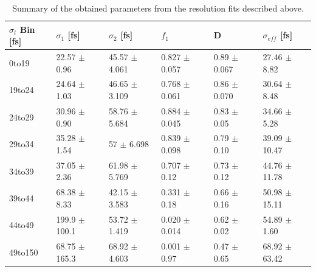 \begin{table}[h]
\centering
 \begin{tabular}{l || l l l | l l}
$\sigma_{t}$ Bin [fs] & $\sigma_{1}$ [fs] & $\sigma_{2}$ [fs] & $f_{1}$ & D & $\sigma_{eff}$ [fs] \\
\hline
0to19 & 22.57 $\pm$ 0.96 & 45.57 $\pm$ 4.061 & 0.827 $\pm$ 0.057 & 0.89 $\pm$ 0.067 & 27.46 $\pm$ 8.82 \\
19to24 & 24.64 $\pm$ 1.03 & 46.65 $\pm$ 3.109 & 0.768 $\pm$ 0.061 & 0.86 $\pm$ 0.070 & 30.64 $\pm$ 8.48 \\
24to29 & 30.96 $\pm$ 0.90 & 58.76 $\pm$ 5.684 & 0.884 $\pm$ 0.045 & 0.83 $\pm$ 0.05 & 34.66 $\pm$ 5.28 \\
29to34 & 35.28 $\pm$ 1.54 & 57 $\pm$ 6.698 & 0.839 $\pm$ 0.098 & 0.79 $\pm$ 0.10 & 39.09 $\pm$ 10.47 \\
34to39 & 37.05 $\pm$ 2.36 & 61.98 $\pm$ 5.769 & 0.707 $\pm$ 0.12 & 0.73 $\pm$ 0.12 & 44.76 $\pm$ 11.78 \\
39to44 & 68.38 $\pm$ 8.33 & 42.15 $\pm$ 3.583 & 0.331 $\pm$ 0.18 & 0.66 $\pm$ 0.16 & 50.98 $\pm$ 15.11 \\
44to49 & 199.9 $\pm$ 100.1 & 53.72 $\pm$ 1.419 & 0.020 $\pm$ 0.014 & 0.62 $\pm$ 0.02 & 54.89 $\pm$ 1.60 \\
49to150 & 68.75 $\pm$ 165.3 & 68.92 $\pm$ 4.603 & 0.001 $\pm$ 0.97 & 0.47 $\pm$ 0.65 & 68.92 $\pm$ 63.42 \\
\hline
\end{tabular}
\caption{Summary of the obtained parameters from the resolution fits described above.}
\label{table:ResoParams}
\end{table}

